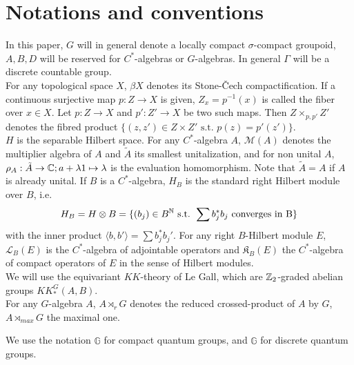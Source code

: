 \section*{Notations and conventions}

In this paper, $G$ will in general denote a locally compact $\sigma$-compact groupoid, $A,B,D$ will be reserved for $C^*$-algebras or $G$-algebras. In general $\Gamma$ will be a discrete countable group.\\

For any topological space $X$, $\beta X$ denotes its Stone-\v{C}ech compactification. If a continuous surjective map $p : Z\rightarrow X $ is given, $Z_x = p^{-1}(x)$ is called the fiber over $x\in X$. Let $p : Z\rightarrow X $ and $p' : Z'\rightarrow X $ be two such maps. Then $Z\times_{p,p'} Z'$ denotes the fibred product $\{(z,z')\in Z\times Z' \text{ s.t. } p(z)=p'(z')\}$. \\ 

$H$ is the separable Hilbert space. For any $C^*$-algebra $A$, $\mathcal M(A)$ denotes the multiplier algebra of $A$ and $\tilde A$ its smallest unitalization, and for non unital $A$, $\rho_A : \tilde A \rightarrow \mathbb C; a+\lambda 1 \mapsto \lambda$ is the evaluation homomorphism. Note that $\tilde A=A$ if $A$ is already unital. If $B$ is a $C^*$-algebra, $H_B$ is the standard right Hilbert module over $B$, i.e. \[H_B= H\otimes B=\{(b_j)\in B^\mathbb N \text{ s.t. }\sum b_j^* b_j \text{ converges in B}\}\] with the inner product $\langle b, b'\rangle = \sum b_j^* b_j'$. For any right $B$-Hilbert module $E$, $\mathcal L_B(E)$ is the $C^*$-algebra of adjointable operators and $\mathfrak K_B(E)$ the $C^*$-algebra of compact operators of $E$ in the sense of Hilbert modules.\\

We will use the equivariant $KK$-theory of Le Gall, which are $\mathbb Z_2$-graded abelian groups $KK^G_*(A,B)$.\\

For any $G$-algebra $A$, $A\rtimes_r G$ denotes the reduced crossed-product of $A$ by $G$, $A\rtimes_{max} G$ the maximal one. 

We use the notation $\mathbb G$ for compact quantum groups, and $\hat{\mathbb G}$ for discrete quantum groups. 
